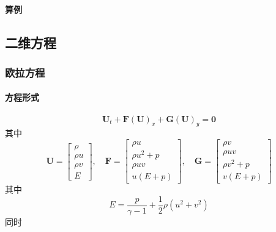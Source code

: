\documentclass{book}
\begin{document}
\paragraph{算例}


\subsection{二维方程}
\subsubsection{欧拉方程}
\paragraph{方程形式}
\begin{equation}
    \mathbf{U}_{t}+\mathbf{F}(\mathbf{U})_{x}+\mathbf{G}(\mathbf{U})_{y}=\mathbf{0}
\end{equation}
其中
\begin{equation}
    \mathbf{U}=\left[\begin{array}{c}
            \rho   \\
            \rho u \\
            \rho v \\
            E
        \end{array}\right], \quad \mathbf{F}=\left[\begin{array}{c}
            \rho u       \\
            \rho u^{2}+p \\
            \rho u v     \\
            u(E+p)
        \end{array}\right], \quad \mathbf{G}=\left[\begin{array}{c}
            \rho v       \\
            \rho u v     \\
            \rho v^{2}+p \\
            v(E+p)
        \end{array}\right]
\end{equation}
其中
\begin{equation}
    E=\dfrac{p}{\gamma-1}+\dfrac{1}{2} \rho\left(u^{2}+v^{2}\right)
\end{equation}
同时
\end{document}
